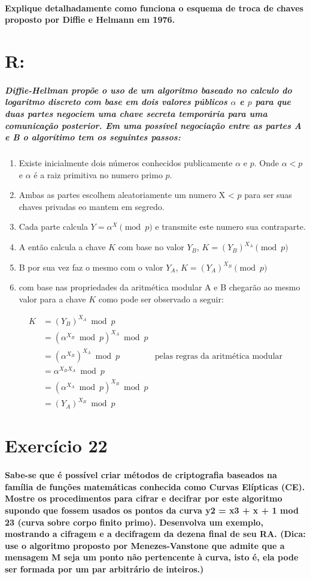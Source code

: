 \documentclass[10pt,a4paper]{report}
\begin{document}
\paragraph{Explique detalhadamente como funciona o esquema de troca de chaves proposto por Diffie e Helmann em 1976.}
\section*{R:}
\subparagraph{Diffie-Hellman propõe o uso de um algoritmo baseado no calculo do logaritmo discreto com base em dois valores públicos $\alpha$ e $p$ para que duas partes negociem uma chave secreta temporária para uma comunicação posterior. Em uma possível negociação entre as partes A e B o algorítimo tem os seguintes passos:}
\begin{enumerate}
\item Existe inicialmente dois números conhecidos publicamente $\alpha$ e $p$. Onde $\alpha < p$ e $\alpha$ é a raiz primitiva no numero primo $p$.
\item Ambas as partes escolhem aleatoriamente um numero X < $p$ para ser suas chaves privadas eo mantem em segredo.
\item Cada parte calcula $Y = \alpha^X \pmod p$ e transmite este numero sua contraparte.
\item A então calcula a chave $K$ com base no valor $Y_B$, $K=(Y_B)^{X_A} \pmod p $
\item B por sua vez faz o mesmo com o valor $Y_A$, $K = (Y_A)^{X_B} \pmod p$
\item com base nas propriedades da aritmética modular A e B chegarão ao mesmo valor para a chave $K$ como pode ser observado a seguir:
\end{enumerate}
\begin{align}
K & = (Y_B)^{X_A} \bmod p \\
& = (\alpha^{X_B} \bmod p)^{X_A} \bmod p \\
& = (\alpha^{X_B})^{X_A} \bmod p  & \textrm{pelas regras da aritmética modular} \\ 
& = \alpha^{X_BX_A} \bmod p \\
& = (\alpha^{X_A} \bmod p)^{X_B} \bmod p \\
& = (Y_A)^{X_B} \bmod p
\end{align}



\section*{Exercício 22}
\paragraph{Sabe-se que é possível criar métodos de criptografia baseados na família de funções matemáticas conhecida como Curvas Elípticas (CE). Mostre os procedimentos para cifrar e decifrar por este algoritmo supondo que fossem usados os pontos da curva y2 = x3 + x + 1 mod 23 (curva sobre corpo finito primo). Desenvolva um exemplo, mostrando a cifragem e a decifragem da dezena final de seu RA. (Dica: use o algoritmo proposto por Menezes-Vanstone que admite que a mensagem M seja um ponto não pertencente à curva, isto é, ela pode ser formada por um par arbitrário de inteiros.)}
\end{document}
